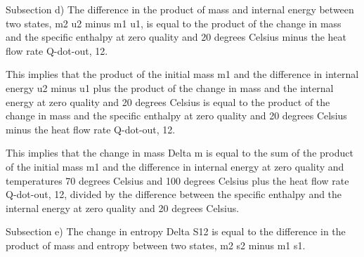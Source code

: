 Subsection d) The difference in the product of mass and internal energy between two states, m2 u2 minus m1 u1, is equal to the product of the change in mass and the specific enthalpy at zero quality and 20 degrees Celsius minus the heat flow rate Q-dot-out, 12.

This implies that the product of the initial mass m1 and the difference in internal energy u2 minus u1 plus the product of the change in mass and the internal energy at zero quality and 20 degrees Celsius is equal to the product of the change in mass and the specific enthalpy at zero quality and 20 degrees Celsius minus the heat flow rate Q-dot-out, 12.

This implies that the change in mass Delta m is equal to the sum of the product of the initial mass m1 and the difference in internal energy at zero quality and temperatures 70 degrees Celsius and 100 degrees Celsius plus the heat flow rate Q-dot-out, 12, divided by the difference between the specific enthalpy and the internal energy at zero quality and 20 degrees Celsius.

Subsection e) The change in entropy Delta S12 is equal to the difference in the product of mass and entropy between two states, m2 s2 minus m1 s1.